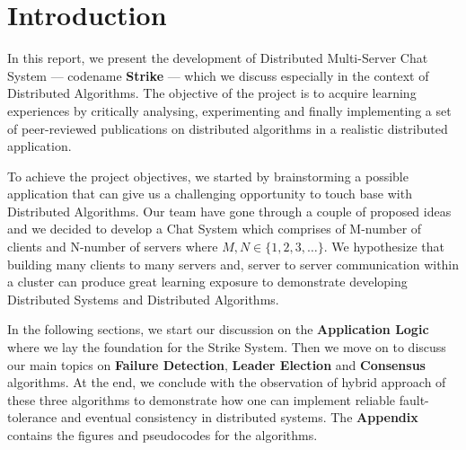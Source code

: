 \documentclass[dareport.tex]{subfiles}
\begin{document}

\section{Introduction}
In this report, we present the development of Distributed Multi-Server Chat System --- codename \textbf{Strike} --- which we discuss especially in the context of Distributed Algorithms. The objective of the project is to acquire learning experiences by critically analysing, experimenting and finally implementing a set of peer-reviewed publications on distributed algorithms in a realistic distributed application.


To achieve the project objectives, we started by brainstorming a possible application that can give us a challenging opportunity to touch base with Distributed Algorithms. Our team have gone through a couple of proposed ideas and we decided to develop a Chat System which comprises of M-number of clients and N-number of servers where $ M,N \in \{1, 2, 3,\dots\} $. We hypothesize that building many clients to many servers and, server to server communication within a cluster can produce great learning exposure to demonstrate developing Distributed Systems and Distributed Algorithms. 


In the following sections, we start our discussion on the \textbf{Application Logic} where we lay the foundation for the Strike System. Then we move on to discuss our main topics on \textbf{Failure Detection}, \textbf{Leader Election} and \textbf{Consensus} algorithms. At the end, we conclude with the observation of hybrid approach of these three algorithms to demonstrate how one can implement reliable fault-tolerance and eventual consistency in distributed systems. The \textbf{Appendix} contains the figures and pseudocodes for the algorithms.
\end{document}
